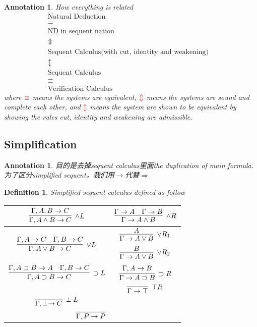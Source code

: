\documentclass{article}
\theoremstyle{plain}
\newtheorem{definition}[theorem]{Definition}
\newtheorem{annotation}[theorem]{Annotation}
\theoremstyle{nonumberplain}
\newcommand{\redt}[1]{\textcolor{red}{#1}}
\begin{document}
\begin{annotation}
\rm How everything is related
$$
\begin{array}{cc}
\text{Natural Deduction} \\
\equiv \\
\text{ND in sequent nation} \\
\Updownarrow \\
\text{Sequent Calculus(with cut, identity and weakening)}&\\
\updownarrow \\
\text{Sequent Calculus}& \\
\equiv \\
\text{Verification Calculus}
\end{array}
$$
where $\redt{\equiv}$ means the systems are equivalent, $\redt{\Updownarrow}$ means the systems are sound and complete each other, and $\redt{\updownarrow}$ means the system are shown to be equivalent by showing the rules cut, identity and weakening are admissible. 
\end{annotation}

\newpage

\subsection{Simplification}

\begin{annotation}
\rm 目的是去掉sequent calculus里面the duplication of main formula. 为了区分simplified sequent，我们用$\to$代替$\Rightarrow$
\end{annotation}

\begin{definition}
\rm \cite{15-317-rsc}Simplified sequent calculus defined as follow
\begin{center}
\begin{tabular}{|c|c|}
\hline $\infer[\wedge L]{\Gamma, A \wedge B \to C}{\Gamma, A, B \to C}$  & $\infer[\wedge R]{\Gamma \to A \wedge B}{\Gamma \to A & \Gamma \to B}$ \rule{0em}{3em} \\
\hline $\infer[\vee L]{\Gamma, A \vee B \to C}{\Gamma, A \to C & \Gamma, B \to C}$ & $\begin{aligned}\infer[\vee R_1]{\Gamma \to A \vee B}{A} \\ \infer[\vee R_2]{\Gamma\to A \vee B}{B} \end{aligned}$ \rule{0em}{3em}\\
\hline $\infer[\supset L]{\Gamma, A \supset B \to C}{\Gamma, A \supset B \to A & \Gamma, B \to C}$ & $\infer[\supset R]{\Gamma \to A \supset B}{\Gamma, A \to B}$ \rule{0em}{3em} \\
\hline & $\infer[\top R]{\Gamma \to \top}{}$ \rule{0em}{2em}\\
\hline $\infer[\perp L]{\Gamma, \perp \to C}{}$ & \rule{0em}{2em}\\
\hline \multicolumn{2}{|c|}{$\infer[]{\Gamma,P \to P}{}$}\rule{0em}{2em}\\
\hline
\end{tabular}
\end{center}
\end{definition}
\end{document}
